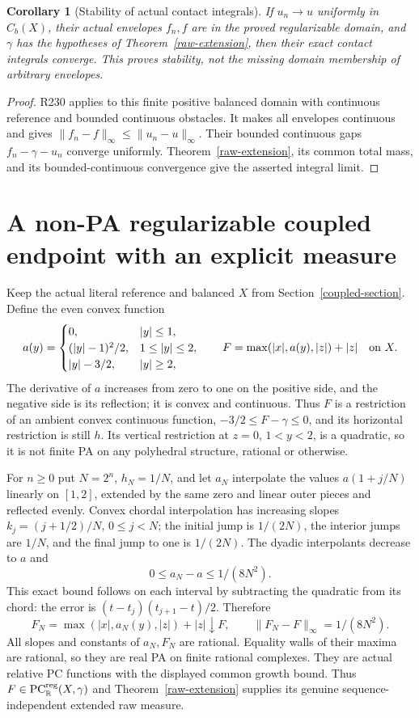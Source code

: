 \documentclass[11pt]{article}
\newtheorem{corollary}[theorem]{Corollary}
\newcommand{\R}{\mathbb R}
\newcommand{\PC}{\operatorname{PC}}
\begin{document}
\begin{corollary}[Stability of actual contact integrals]\label{contact-stability}
If $u_n\to u$ uniformly in $C_b(X)$, their actual envelopes $f_n,f$
are in the proved regularizable domain, and $\gamma$ has the hypotheses
of Theorem~\ref{raw-extension}, then their exact contact integrals converge.
This proves stability, not the missing domain membership of arbitrary
envelopes.
\end{corollary}
\begin{proof}
R230 applies to this finite positive balanced domain with continuous
reference and bounded continuous obstacles. It makes all envelopes
continuous and gives $\|f_n-f\|_\infty\leq\|u_n-u\|_\infty$.
Their bounded continuous gaps $f_n-\gamma-u_n$ converge uniformly.
Theorem~\ref{raw-extension}, its common total mass, and its
bounded-continuous convergence give the asserted integral limit.
\end{proof}

\section{A non-PA regularizable coupled endpoint with an explicit measure}\label{nonpa-section}
Keep the actual literal reference and balanced $X$ from
Section~\ref{coupled-section}. Define the even convex function
\[
 a(y)=\begin{cases}
 0,&|y|\leq1,\\
 (|y|-1)^2/2,&1\leq|y|\leq2,\\
 |y|-3/2,&|y|\geq2,
 \end{cases}
 \qquad F=\max(|x|,a(y),|z|)+|z|\quad\hbox{on }X.
\]
The derivative of $a$ increases from zero to one on the positive side,
and the negative side is its reflection; it is convex and continuous.
Thus $F$ is a restriction of an ambient convex continuous function,
$-3/2\leq F-\gamma\leq0$, and its horizontal restriction is still $h$.
Its vertical restriction at $z=0$, $1<y<2$, is a quadratic, so it is
not finite PA on any polyhedral structure, rational or otherwise.

For $n\geq0$ put $N=2^n$, $h_N=1/N$, and let $a_N$ interpolate the
values $a(1+j/N)$ linearly on $[1,2]$, extended by the same zero and
linear outer pieces and reflected evenly. Convex chordal interpolation
has increasing slopes
$k_j=(j+1/2)/N$, $0\leq j<N$; the initial jump is $1/(2N)$,
the interior jumps are $1/N$, and the final jump to one is $1/(2N)$.
The dyadic interpolants decrease to $a$ and
\[
 0\leq a_N-a\leq1/(8N^2).
\]
This exact bound follows on each interval by subtracting the quadratic
from its chord: the error is $(t-t_j)(t_{j+1}-t)/2$.
Therefore
\[
 F_N=\max(|x|,a_N(y),|z|)+|z|\downarrow F,\qquad
 \|F_N-F\|_\infty=1/(8N^2).
\]
All slopes and constants of $a_N,F_N$ are rational. Equality walls of
their maxima are rational, so they are real PA on finite rational
complexes. They are actual relative PC functions with the displayed
common growth bound. Thus $F\in\PC^{\rm reg}_{\R}(X,\gamma)$ and
Theorem~\ref{raw-extension} supplies its genuine sequence-independent
extended raw measure.
\end{document}
